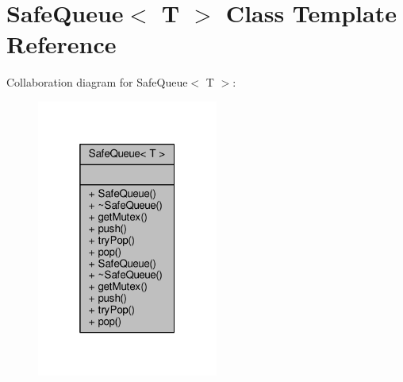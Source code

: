 \hypertarget{class_safe_queue}{}\section{Safe\+Queue$<$ T $>$ Class Template Reference}
\label{class_safe_queue}


Collaboration diagram for Safe\+Queue$<$ T $>$\+:\nopagebreak
\begin{figure}[H]
\begin{center}
\leavevmode
\includegraphics[width=169pt]{de/d82/class_safe_queue__coll__graph}
\end{center}
\end{figure}
